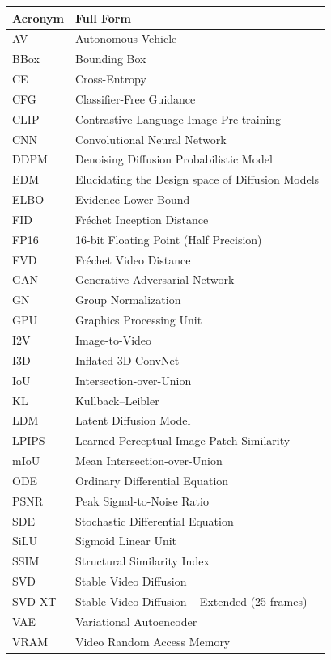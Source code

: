 \documentclass[12pt,DIV14,BCOR12mm,a4paper,footinclude=false,headinclude,parskip=half-,twoside,openright,cleardoublepage=empty,toc=index,bibliography=totoc,listof=totoc]{scrreprt}
\numberwithin{equation}{chapter}
\begin{document}
\begin{table}[h]
    \centering
    \begin{tabular}{ll}
        \toprule
        \textbf{Acronym} & \textbf{Full Form} \\
        \midrule
        AV & Autonomous Vehicle \\
        BBox & Bounding Box \\
        CE & Cross-Entropy \\
        CFG & Classifier-Free Guidance \\
        CLIP & Contrastive Language-Image Pre-training \\
        CNN & Convolutional Neural Network \\
        DDPM & Denoising Diffusion Probabilistic Model \\
        EDM & Elucidating the Design space of Diffusion Models \\
        ELBO & Evidence Lower Bound \\
        FID & Fr\'echet Inception Distance \\
        FP16 & 16-bit Floating Point (Half Precision) \\
        FVD & Fr\'echet Video Distance \\
        GAN & Generative Adversarial Network \\
        GN & Group Normalization \\
        GPU & Graphics Processing Unit \\
        I2V & Image-to-Video \\
        I3D & Inflated 3D ConvNet \\
        IoU & Intersection-over-Union \\
        KL & Kullback--Leibler \\
        LDM & Latent Diffusion Model \\
        LPIPS & Learned Perceptual Image Patch Similarity \\
        mIoU & Mean Intersection-over-Union \\
        ODE & Ordinary Differential Equation \\
        PSNR & Peak Signal-to-Noise Ratio \\
        SDE & Stochastic Differential Equation \\
        SiLU & Sigmoid Linear Unit \\
        SSIM & Structural Similarity Index \\
        SVD & Stable Video Diffusion \\
        SVD-XT & Stable Video Diffusion -- Extended (25 frames) \\
        VAE & Variational Autoencoder \\
        VRAM & Video Random Access Memory \\
        \bottomrule
    \end{tabular}
\end{table}
\end{document}
